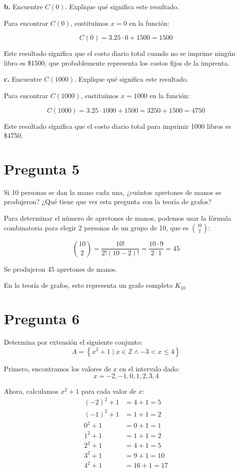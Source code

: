 \documentclass{article}
\begin{document}
\textbf{b.} Encuentre \( C(0) \). Explique qué significa este resultado.

Para encontrar \( C(0) \), sustituimos \( x = 0 \) en la función:

\[ C(0) = 3.25 \cdot 0 + 1500 = 1500 \]

Este resultado significa que el costo diario total cuando no se imprime ningún libro es \$1500, que probablemente representa los costos fijos de la imprenta.

\textbf{c.} Encuentre \( C(1000) \). Explique qué significa este resultado.

Para encontrar \( C(1000) \), sustituimos \( x = 1000 \) en la función:

\[ C(1000) = 3.25 \cdot 1000 + 1500 = 3250 + 1500 = 4750 \]

Este resultado significa que el costo diario total para imprimir 1000 libros es \$4750.

\newpage

\section*{Pregunta 5}

Si 10 personas se dan la mano cada una, ¿cuántos apretones de manos se produjeron? ¿Qué tiene que ver esta pregunta con la teoría de grafos?

Para determinar el número de apretones de manos, podemos usar la fórmula combinatoria para elegir 2 personas de un grupo de 10, que es \(\binom{10}{2}\):

\[ \binom{10}{2} = \frac{10!}{2!(10-2)!} = \frac{10 \cdot 9}{2 \cdot 1} = 45 \]

Se produjeron 45 apretones de manos.

En la teoría de grafos, esto representa un grafo completo \( K_{10} \)

\section*{Pregunta 6}

Determina por extensión el siguiente conjunto:
\[ A = \left\{ x^2 + 1 \mid x \in \mathbb{Z} \land -3 < x \leq 4 \right\} \]

Primero, encontramos los valores de \( x \) en el intervalo dado:
\[ x = -2, -1, 0, 1, 2, 3, 4 \]

Ahora, calculamos \( x^2 + 1 \) para cada valor de \( x \):
\[ 
\begin{align*}
(-2)^2 + 1 & = 4 + 1 = 5 \\
(-1)^2 + 1 & = 1 + 1 = 2 \\
0^2 + 1 & = 0 + 1 = 1 \\
1^2 + 1 & = 1 + 1 = 2 \\
2^2 + 1 & = 4 + 1 = 5 \\
3^2 + 1 & = 9 + 1 = 10 \\
4^2 + 1 & = 16 + 1 = 17 \\
\end{align*}
\]
\end{document}
